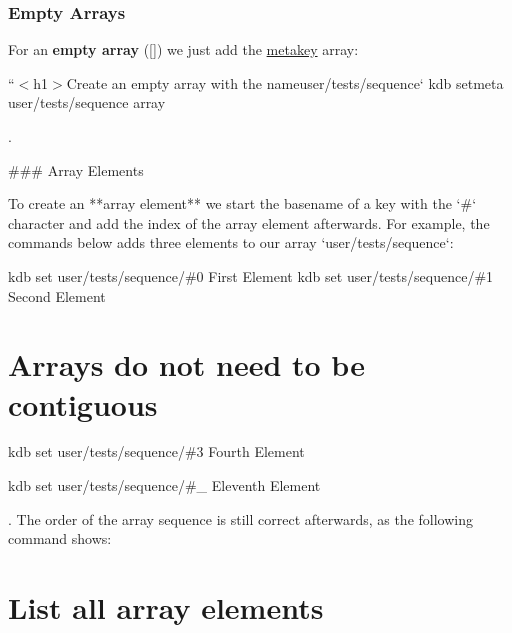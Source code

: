 \subsubsection*{Empty Arrays}

For an {\bfseries empty array} ({\ttfamily \mbox{[}\mbox{]}}) we just add the \hyperlink{doc_help_elektra-metadata_md}{metakey} {\ttfamily array}\+:

``{\ttfamily  $<$h1$>$Create an empty array with the name}user/tests/sequence` kdb setmeta user/tests/sequence array \textquotesingle{}\textquotesingle{} 
\begin{DoxyCode}
.

### Array Elements

To create an **array element** we start the basename of a key with the `#` character and add the index of
       the array element afterwards. For example, the commands below adds three elements to our array
       `user/tests/sequence`:
\end{DoxyCode}
 kdb set user/tests/sequence/\#0 \textquotesingle{}First Element\textquotesingle{} kdb set user/tests/sequence/\#1 \textquotesingle{}Second Element\textquotesingle{} \section*{Arrays do not need to be contiguous}

kdb set user/tests/sequence/\#3 \textquotesingle{}Fourth Element\textquotesingle{} 
 kdb set user/tests/sequence/\#\+\_ \textquotesingle{}Eleventh Element\textquotesingle{} 
\begin{DoxyCode}
. The order of the array sequence is still correct afterwards, as the following command shows:
\end{DoxyCode}
 \section*{List all array elements}

